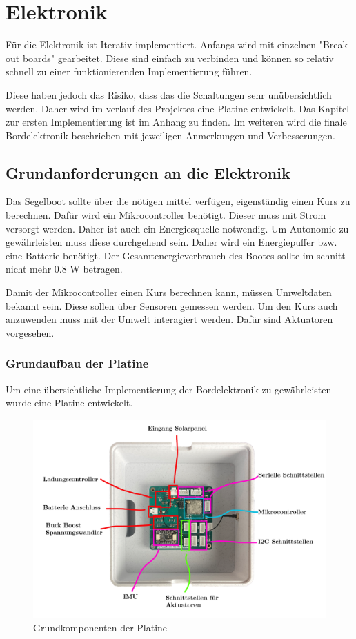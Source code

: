 

\chapter{Elektronik}
Für die Elektronik ist Iterativ implementiert.
Anfangs wird mit einzelnen "Break out boards" gearbeitet. Diese sind einfach zu verbinden und können so relativ schnell zu einer funktionierenden Implementierung führen.

Diese haben jedoch das Risiko, dass das die Schaltungen sehr unübersichtlich werden. Daher wird im verlauf des Projektes eine Platine entwickelt. Das Kapitel zur ersten Implementierung ist im Anhang zu finden. Im weiteren wird die finale Bordelektronik beschrieben mit jeweiligen Anmerkungen und Verbesserungen.


\section{Grundanforderungen an die Elektronik}
Das Segelboot sollte über die nötigen mittel verfügen, eigenständig einen Kurs zu berechnen. Dafür wird ein Mikrocontroller benötigt.
Dieser muss mit Strom versorgt werden. Daher ist auch ein Energiesquelle notwendig. Um Autonomie zu gewährleisten muss diese durchgehend sein. Daher wird ein Energiepuffer bzw. eine Batterie benötigt. Der Gesamtenergieverbrauch des Bootes sollte im schnitt nicht mehr 0.8 W betragen. 

Damit der Mikrocontroller einen Kurs berechnen kann, müssen Umweltdaten bekannt sein. Diese sollen über Sensoren gemessen werden. Um den Kurs auch anzuwenden muss mit der Umwelt interagiert werden. Dafür sind Aktuatoren vorgesehen.






 \subsection{Grundaufbau der Platine}
Um eine übersichtliche Implementierung der Bordelektronik zu gewährleisten wurde eine Platine entwickelt.


\begin{figure}[H]
    \centering
    \includegraphics[width=1\linewidth]{Overview PCB_colored.png}
    \caption{Grundkomponenten der Platine}
    \label{fig:core_pcb}
\end{figure}
 
